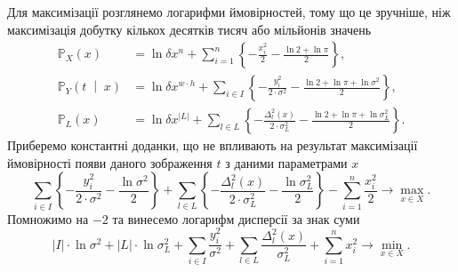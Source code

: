 Для максимізації розглянемо логарифми ймовірностей,
тому що це зручніше,
ніж максимізація добутку кількох десятків тисяч або мільйонів значень
\begin{equation*}
  \begin{split}
    \mathbb{P}_X\left( x \right)
    &= \ln{\delta x^n} +
        \sum_{i = 1}^n
        \left\{
          - \frac{x_i^2}{2}
          - \frac{\ln{2} + \ln{\pi}}{2}
        \right\}, \\
    \mathbb{P}_Y\left( t \;\middle|\; x \right)
    &= \ln{\delta x^{w \cdot h}} +
        \sum_{i \in I}
        \left\{
          - \frac{y_i^2}{2 \cdot \sigma^2}
          - \frac{\ln{2} + \ln{\pi} + \ln{\sigma^2}}{2}
        \right\}, \\
    \mathbb{P}_L\left( x \right)
    &= \ln{\delta x^{\left| L \right|}} +
        \sum_{l \in L}
        \left\{
          - \frac{\Delta_l^2\left( x \right)}{2 \cdot \sigma_L^2}
          - \frac{\ln{2} + \ln{\pi} + \ln{\sigma_L^2}}{2}
        \right\}.
  \end{split}
\end{equation*}
Приберемо константні доданки,
що не впливають на результат максимізації ймовірності
появи даного зображення $t$ з даними параметрами $x$
\begin{equation*}
  \sum_{i \in I}
    \left\{
      - \frac{y_i^2}{2 \cdot \sigma^2}
      - \frac{\ln{\sigma^2}}{2}
    \right\}
  +
  \sum_{l \in L}
    \left\{
      - \frac{\Delta_l^2\left( x \right)}{2 \cdot \sigma_L^2}
      - \frac{\ln{\sigma_L^2}}{2}
    \right\}
  - \sum_{i = 1}^n \frac{x_i^2}{2}
  \to \max\limits_{x \in X}.
\end{equation*}
Помножимо на $-2$ та винесемо логарифм дисперсії за знак суми
\begin{equation}\label{eq:minimize}
  \left| I \right| \cdot \ln{\sigma^2}
  + \left| L \right| \cdot \ln{\sigma_L^2}
  + \sum_{i \in I} \frac{y_i^2}{\sigma^2}
  + \sum_{l \in L} \frac{\Delta_l^2\left( x \right)}{\sigma_L^2}
  + \sum_{i = 1}^n x_i^2
  \to \min\limits_{x \in X}.
\end{equation}

